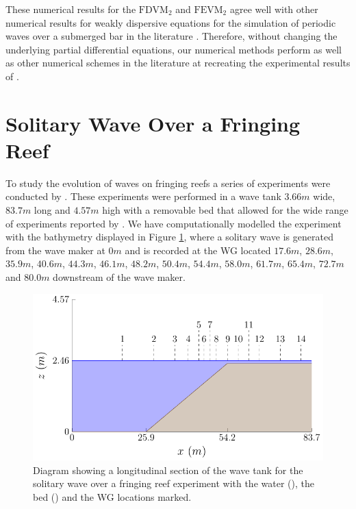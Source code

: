 These numerical results for the $\text{FDVM}_2$ and $\text{FEVM}_2$ agree well with other numerical results for weakly dispersive equations for the simulation of periodic waves over a submerged bar in the literature \cite{Beji-Battjes-1994-1,Lannes-2013,Li-2014-169,Zhang-2013-13}. Therefore, without changing the underlying partial differential equations, our numerical methods perform as well as other numerical schemes in the literature at recreating the experimental results of \citet{Beji-Battjes-1994-1}.

\section{Solitary Wave Over a Fringing Reef}
To study the evolution of waves on fringing reefs a series of experiments were conducted by \citet{Roeber-2010}. These experiments were performed in a wave tank $3.66m$ wide, $83.7m$ long and $4.57m$ high with a removable bed that allowed for the wide range of experiments reported by \citet{Roeber-2010}. We have computationally modelled the experiment with the bathymetry displayed in Figure \ref{fig:RoeberWT}, where a solitary wave is generated from the wave maker at $0m$ and is recorded at the WG located $17.6m$, $28.6m$, $35.9m$, $40.6m$, $44.3m$, $46.1m$, $48.2m$, $50.4m$, $54.4m$, $58.0m$, $61.7m$, $65.4m$, $72.7m$ and $80.0m$ downstream of the wave maker.
\begin{figure}
	\centering
	\includegraphics[width=\textwidth]{./chp6/figures/Experiment/Roeber/Trial8/WaveTank.pdf}
	\caption{Diagram showing a longitudinal section of the wave tank for the solitary wave over a fringing reef experiment with the water (), the bed () and the WG locations marked.}
	\label{fig:RoeberWT}
\end{figure}

